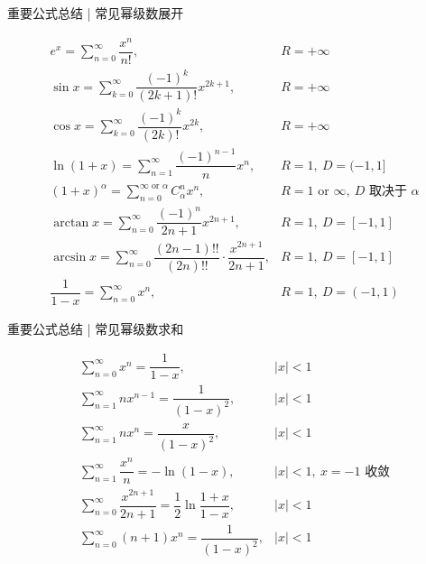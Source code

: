 
\begin{frame}{重要公式总结 | 常见幂级数展开}

{\smaller[1]
\[
\begin{array}{ll}
e^x = \displaystyle\sum_{n=0}^\infty \dfrac{x^n}{n!}, & R = +\infty \\[1.5em]
\sin x = \displaystyle\sum_{k=0}^\infty \dfrac{(-1)^k}{(2k+1)!} x^{2k+1}, & R = +\infty \\[1.5em]
\cos x = \displaystyle\sum_{k=0}^\infty \dfrac{(-1)^k}{(2k)!} x^{2k}, & R = +\infty \\[1.5em]
\ln(1+x) = \displaystyle\sum_{n=1}^\infty \dfrac{(-1)^{n-1}}{n} x^n, & R = 1,\ D = (-1, 1] \\[1.5em]
(1+x)^\alpha = \displaystyle\sum_{n=0}^{\infty \text{ or } \alpha} C_\alpha^n x^n, & R = 1 \text{ or } \infty,\ D \text{ 取决于 } \alpha \\[1.5em]
\arctan x = \displaystyle\sum_{n=0}^\infty \dfrac{(-1)^n}{2n+1} x^{2n+1}, & R = 1,\ D = [-1, 1] \\[1.5em]
\arcsin x = \displaystyle\sum_{n=0}^\infty \dfrac{(2n-1)!!}{(2n)!!} \cdot \dfrac{x^{2n+1}}{2n+1}, & R = 1,\ D = [-1, 1] \\[1.5em]
\dfrac{1}{1-x} = \displaystyle\sum_{n=0}^\infty x^n, & R = 1,\ D = (-1, 1)
\end{array}
\]
}

\end{frame}


\begin{frame}{重要公式总结 | 常见幂级数求和}

\[
\begin{array}{ll}
\displaystyle\sum_{n=0}^\infty x^n = \dfrac{1}{1-x}, & |x| < 1 \\[1.5em]
\displaystyle\sum_{n=1}^\infty n x^{n-1} = \dfrac{1}{(1-x)^2}, & |x| < 1 \\[1.5em]
\displaystyle\sum_{n=1}^\infty n x^n = \dfrac{x}{(1-x)^2}, & |x| < 1 \\[1.5em]
\displaystyle\sum_{n=1}^\infty \dfrac{x^n}{n} = -\ln(1-x), & |x| < 1,\ x = -1 \text{ 收敛} \\[1.5em]
\displaystyle\sum_{n=0}^\infty \dfrac{x^{2n+1}}{2n+1} = \dfrac{1}{2} \ln \dfrac{1+x}{1-x}, & |x| < 1 \\[1.5em]
\displaystyle\sum_{n=0}^\infty (n+1) x^n = \dfrac{1}{(1-x)^2}, & |x| < 1
\end{array}
\]

\end{frame}

